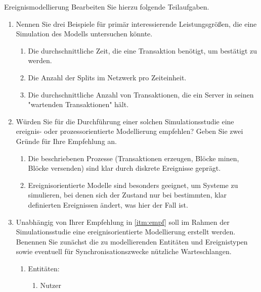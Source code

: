 \documentclass{article}
\begin{document}
\begin{exercise}{Ereignismodellierung}
  Bearbeiten Sie hierzu folgende Teilaufgaben.
  \begin{enumerate}
    \item\label{itm:prim} Nennen Sie drei Beispiele für primär interessierende Leistungsgrößen, die eine Simulation des Modells untersuchen könnte.
          \begin{solution}
            \begin{enumerate}
              \item Die durchschnittliche Zeit, die eine Transaktion benötigt, um bestätigt zu werden.
              \item Die Anzahl der Splits im Netzwerk pro Zeiteinheit.
              \item Die durchschnittliche Anzahl von Transaktionen, die ein Server in seinen "wartenden Transaktionen" hält.
            \end{enumerate}
          \end{solution}
    \item\label{itm:empf} Würden Sie für die Durchführung einer solchen Simulationsstudie eine ereignis- oder prozessorientierte Modellierung empfehlen? Geben Sie zwei Gründe für Ihre Empfehlung an.
          \begin{solution}
            \begin{enumerate}
              \item Die beschriebenen Prozesse (Transaktionen erzeugen, Blöcke minen, Blöcke versenden) sind klar durch diskrete Ereignisse geprägt.
              \item Ereignisorientierte Modelle sind besonders geeignet, um Systeme zu simulieren, bei denen sich der Zustand nur bei bestimmten, klar definierten Ereignissen ändert, was hier der Fall ist.
            \end{enumerate}
          \end{solution}
    \item\label{itm:ent} Unabhängig von Ihrer Empfehlung in \ref{itm:empf} soll im Rahmen der Simulationsstudie eine ereignisorientierte Modellierung erstellt werden. Benennen Sie zunächst die zu modellierenden Entitäten und Ereignistypen sowie eventuell für Synchronisationszwecke nützliche Warteschlangen.
          \begin{solution}
            \begin{enumerate}
              \item Entitäten:
                    \begin{enumerate}
                      \item Nutzer

\end{enumerate}
\end{enumerate}
\end{solution}
\end{enumerate}
\end{exercise}
\end{document}
